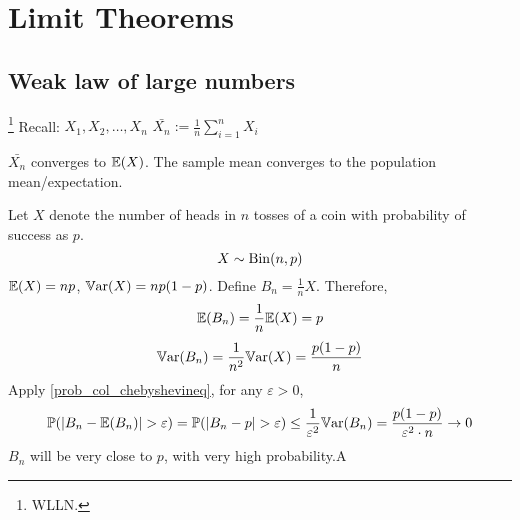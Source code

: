 \documentclass[10pt, a4paper]{article}
\begin{document}
\newpage

\section{Limit Theorems}

\subsection{Weak law of large numbers}\footnote{WLLN.}
Recall:
$X_1, X_2, \dotsc, X_n$
$\bar{X_n} := \frac{1}{n}\sum_{i = 1}^{n}X_i$

$\bar{X_n}$ converges to $\mathbb{E}(X)$.
The sample mean converges to the population mean/expectation.

Let $X$ denote the number of heads in $n$ tosses of a coin with probability of success as $p$.
\[
X \sim \operatorname{Bin}(n, p)
\]
$\mathbb{E}(X) = np$,
$\mathbb{V}\mathrm{ar}(X) = np(1 - p)$.
Define $B_n = \frac{1}{n}X$.
Therefore,
\[
\mathbb{E}(B_n) = \frac{1}{n}\mathbb{E}(X) = p
\]
\[
\mathbb{V}\mathrm{ar}(B_n) = \frac{1}{n ^ 2}\mathbb{V}\mathrm{ar}(X) = \frac{p(1 - p)}{n}
\]
Apply \autoref{prob_col_chebyshevineq},
for any $\varepsilon > 0$,
\[
\mathbb{P}(|B_n - \mathbb{E}(B_n)| > \varepsilon) = \mathbb{P}(|B_n - p| > \varepsilon) \leq \frac{1}{\varepsilon ^ 2}\mathbb{V}\mathrm{ar}(B_n) = \frac{p(1 - p)}{\varepsilon ^ 2 \cdot n} \rightarrow 0
\]
$B_n$ will be very close to $p$,
with very high probability.A
\end{document}
